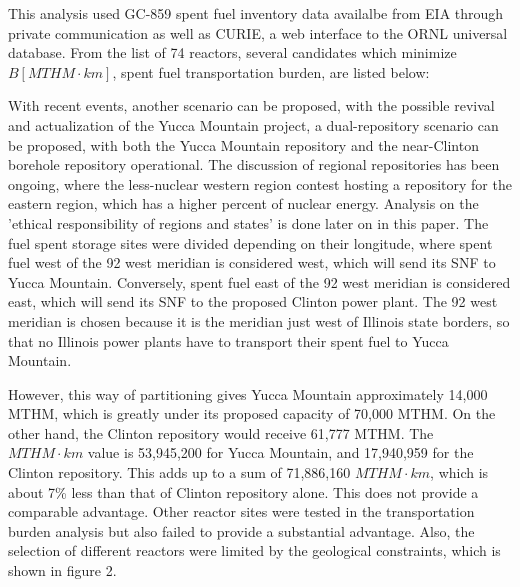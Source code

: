 This analysis used GC-859 spent fuel inventory data availalbe from \gls{EIA} 
through private communication \cite{domenico_GC-859_2016} as well as \gls{CURIE}, a web interface to 
the \gls{ORNL} universal database\cite{ornl_centralized_2016}.
From the list of 74 reactors, several candidates which minimize $B [MTHM\cdot 
km]$, spent fuel transportation burden, are listed below:
    
\begin{table}[h]
\centering

        \caption { Reactors with relatively small spent fuel transportation burden $ [MTHM\cdot km]$.}
\end {table}

With recent events, another scenario can be proposed, with the possible revival
and actualization of the Yucca Mountain project, a dual-repository scenario can be
proposed, with both the Yucca Mountain repository and the near-Clinton borehole
repository operational. The discussion of regional repositories has been ongoing,
where the less-nuclear western region contest hosting a repository for the eastern region,
which has a higher percent of nuclear energy. %
Analysis on the 'ethical responsibility of regions and states' is done later on
in this paper.
The fuel spent storage sites were divided depending on their
longitude, where spent fuel west of the 92 west meridian is considered west, 
which will send its \gls{SNF} to Yucca Mountain. Conversely, spent fuel east of the 92 west
meridian is considered east, which will send its \gls{SNF} to the proposed Clinton 
power plant. The 92 west meridian is chosen because it is the meridian just west of
Illinois state borders, so that no Illinois power plants have to transport their
spent fuel to Yucca Mountain. %

However, this way of partitioning gives Yucca Mountain approximately 14,000 MTHM,
which is greatly under its proposed capacity of 70,000 MTHM. On the other hand, 
the Clinton repository would receive 61,777 MTHM. The $MTHM\cdot km$ value is 
53,945,200 for Yucca Mountain, and 17,940,959 for the Clinton repository. This 
adds up to a sum of 71,886,160 $MTHM\cdot km$, which is about 7\% less than that
of Clinton repository alone. This does not provide a comparable advantage. Other
reactor sites were tested in the transportation burden analysis but also failed
to provide a substantial advantage. Also, the selection of different reactors
were limited by the geological constraints, which is shown in figure 2.  

